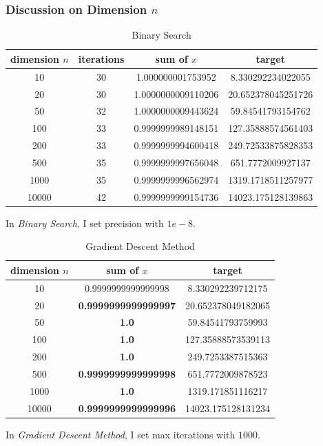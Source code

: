 \documentclass[12pt, a4paper, oneside]{article}
\begin{document}
\subsubsection{Discussion on Dimension $n$}
\begin{table}[H]
    \begin{center}
      \caption{Binary Search}
      \begin{tabular}{c|c|c|c} %
        \textbf{dimension $n$} & \textbf{iterations} & \textbf{sum of $x$} & \textbf{target}\\
        \hline
        10 & 30 & 1.000000001753952 & 8.330292234022055 \\
        20 & 30 & 1.0000000009110206 & 20.652378045251726 \\
        50 & 32 & 1.0000000009443624 & 59.84541793154762 \\
        100 & 33 & 0.9999999989148151 & 127.35888574561403 \\
        200 & 33 & 0.9999999994600418 & 249.72533875828353 \\
        500 & 35 & 0.9999999997656048 & 651.7772009927137 \\
        1000 & 35 & 0.9999999996562974 & 1319.1718511257977 \\
        10000 & 42 & 0.9999999999154736 & 14023.175128139863 
      \end{tabular}
    \end{center}
\end{table}
In \textit{Binary Search}, I set precision with $1e-8$.

\begin{table}[H]
    \begin{center}
      \caption{Gradient Descent Method}
      \begin{tabular}{c|c|c} %
        \textbf{dimension $n$} & \textbf{sum of $x$} & \textbf{target}\\
        \hline
        10 & 0.9999999999999998 & 8.330292239712175 \\
        20 & \textbf{0.9999999999999997} & 20.652378049182065 \\
        50 & \textbf{1.0} & 59.84541793759993 \\
        100 & \textbf{1.0} & 127.35888573539113 \\
        200 & \textbf{1.0} & 249.7253387515363 \\
        500 & \textbf{0.9999999999999998} & 651.7772009878523 \\
        1000 & \textbf{1.0} & 1319.171851116217 \\
        10000 & \textbf{0.9999999999999996} & 14023.175128131234 
      \end{tabular}
    \end{center}
\end{table}
In \textit{Gradient Descent Method}, I set max iterations with $1000$.
\end{document}
